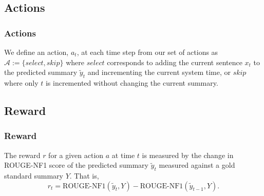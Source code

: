 \documentclass[]{beamer}
\begin{document}
	\subsection{Actions}
	\begin{frame}
			\frametitle{Actions}
			We define an action, $a_t$, at each time step from our set of actions as $\mathcal{A} := \{select, skip\}$ where $select$ corresponds to adding the current sentence $x_t$ to the predicted summary $\tilde{y}_t$ and incrementing the current system time, or $skip$ where only $t$ is incremented without changing the current summary.
	\end{frame}

	\subsection{Reward}
	\begin{frame}
			\frametitle{Reward}
				The reward $r$ for a given action $a$ at time $t$ is measured by the change in ROUGE-NF1 score of the predicted summary $\tilde{y}_{t}$ measured against a gold standard summary $Y$. That is, 
				\begin{equation}
					r_t = \textrm{ROUGE-NF1}(\tilde{y}_{t}, Y) -  \textrm{ROUGE-NF1}(\tilde{y}_{t-1}, Y).
				\end{equation}
	\end{frame}
\end{document}
